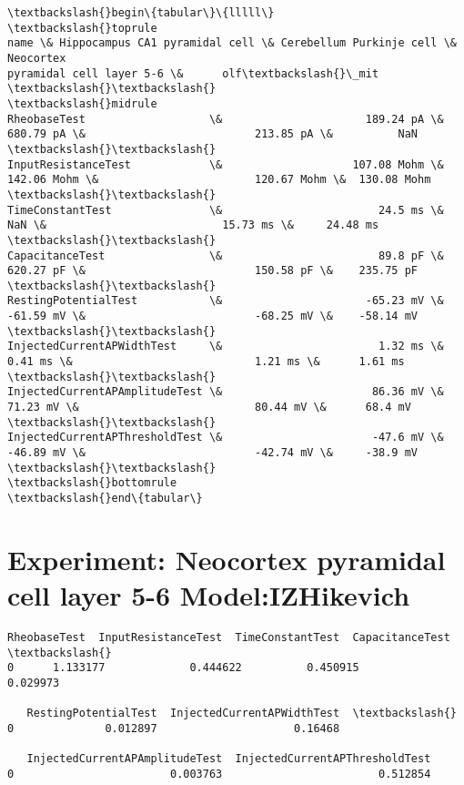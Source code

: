         
    \begin{Verbatim}[commandchars=\\\{\}]
\textbackslash{}begin\{tabular\}\{lllll\}
\textbackslash{}toprule
name \& Hippocampus CA1 pyramidal cell \& Cerebellum Purkinje cell \& Neocortex
pyramidal cell layer 5-6 \&      olf\textbackslash{}\_mit \textbackslash{}\textbackslash{}
\textbackslash{}midrule
RheobaseTest                   \&                      189.24 pA \&
680.79 pA \&                          213.85 pA \&          NaN \textbackslash{}\textbackslash{}
InputResistanceTest            \&                    107.08 Mohm \&
142.06 Mohm \&                        120.67 Mohm \&  130.08 Mohm \textbackslash{}\textbackslash{}
TimeConstantTest               \&                        24.5 ms \&
NaN \&                           15.73 ms \&     24.48 ms \textbackslash{}\textbackslash{}
CapacitanceTest                \&                        89.8 pF \&
620.27 pF \&                          150.58 pF \&    235.75 pF \textbackslash{}\textbackslash{}
RestingPotentialTest           \&                      -65.23 mV \&
-61.59 mV \&                          -68.25 mV \&    -58.14 mV \textbackslash{}\textbackslash{}
InjectedCurrentAPWidthTest     \&                        1.32 ms \&
0.41 ms \&                            1.21 ms \&      1.61 ms \textbackslash{}\textbackslash{}
InjectedCurrentAPAmplitudeTest \&                       86.36 mV \&
71.23 mV \&                           80.44 mV \&      68.4 mV \textbackslash{}\textbackslash{}
InjectedCurrentAPThresholdTest \&                       -47.6 mV \&
-46.89 mV \&                          -42.74 mV \&     -38.9 mV \textbackslash{}\textbackslash{}
\textbackslash{}bottomrule
\textbackslash{}end\{tabular\}

    \end{Verbatim}

    \hypertarget{experiment-neocortex-pyramidal-cell-layer-5-6-modelizhikevich}{%
\section{Experiment: Neocortex pyramidal cell layer 5-6
Model:IZHikevich}\label{experiment-neocortex-pyramidal-cell-layer-5-6-modelizhikevich}}

            \begin{tcolorbox}[breakable, size=fbox, boxrule=.5pt, pad at break*=1mm, opacityfill=0]
\begin{Verbatim}[commandchars=\\\{\}]
   RheobaseTest  InputResistanceTest  TimeConstantTest  CapacitanceTest  \textbackslash{}
0      1.133177             0.444622          0.450915         0.029973

   RestingPotentialTest  InjectedCurrentAPWidthTest  \textbackslash{}
0              0.012897                     0.16468

   InjectedCurrentAPAmplitudeTest  InjectedCurrentAPThresholdTest
0                        0.003763                        0.512854
\end{Verbatim}
\end{tcolorbox}
        
